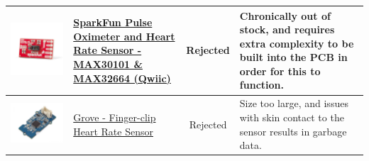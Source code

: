\documentclass[12pt, titlepage]{article}
\begin{document}
\begin{table}[H]
\begin{tabular}{ | c | m{3cm} | c | m{7cm} |}
    \includegraphics[scale = 0.5]{sparkfun}     & \href{https://www.sparkfun.com/products/15219}{SparkFun Pulse Oximeter and Heart Rate Sensor - MAX30101 \& MAX32664 (Qwiic)}                                      & Rejected        & Chronically out of stock, and requires extra complexity to be built into the PCB in order for this to function.                                                                                                                                                          \\
    \hline
    \includegraphics[scale = 0.25]{grove1}      & \href{https://www.seeedstudio.com/Grove-Finger-clip-Heart-Rate-Sensor.html?queryID=ad9334e40c7058a87ffd810044eecd1c                                               & objectID=711    & indexName=bazaar_retailer_products}{Grove - Finger-clip Heart Rate Sensor}                                                                                & Rejected & Size too large, and issues with skin contact to the sensor results in garbage data.               \\

\end{tabular}
\end{table}
\end{document}
